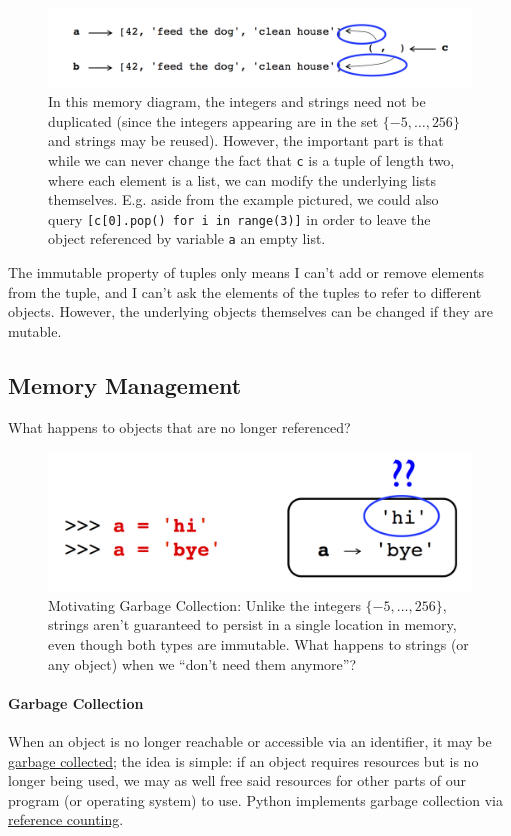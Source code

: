 \documentclass[12pt,letterpaper,twoside]{article}
\begin{document}
\begin{figure}[h]
\centering
\includegraphics[scale=0.45]{fig/tuples-and-immutability.png}
\caption{\footnotesize In this memory diagram, the integers and strings need not be duplicated 
(since the integers appearing are in the set $\{-5, \ldots, 256\}$ and strings may
be reused). However, the important part is that while we can never change the fact that 
\texttt{c} is a tuple of length two, where each element is a list, we can modify the underlying
lists themselves. E.g. aside from the example pictured, we could also query 
\texttt{[c[0].pop() for i in range(3)]} in order to leave the object referenced by variable 
\texttt{a} an empty list.}
\end{figure}

The immutable property of tuples only means I can't add or remove elements from the tuple, and I can't
ask the elements of the tuples to refer to different objects. However, the underlying objects themselves
can be changed if they are mutable.

\subsection{Memory Management}
What happens to objects that are no longer referenced?

\begin{figure}[h]
\centering
\includegraphics[scale=0.35]{fig/gc-1.png}
\caption{Motivating Garbage Collection: Unlike the integers $\{-5, \ldots, 256\}$, strings aren't guaranteed
to persist in a single location in memory, even though both types are immutable. What happens to strings (or any object) when we
``don't need them anymore''?}
\end{figure}

\paragraph{Garbage Collection}
When an object is no longer reachable or accessible via an identifier, it may be \href{https://en.wikipedia.org/wiki/Garbage_collection_(computer_science)}{garbage collected};
the idea is simple: if an object requires resources but is no longer being used, we may as well free said resources for other parts of our program (or operating system) to use. 
Python implements garbage collection via \href{https://en.wikipedia.org/wiki/Reference_counting#Use_in_garbage_collection}{reference counting}.
\end{document}
